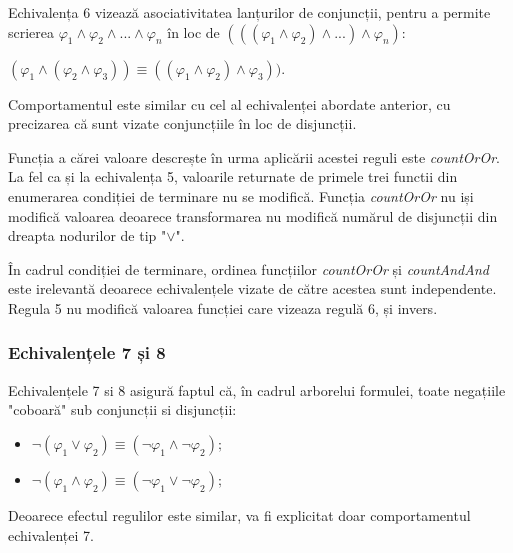 Echivalența 6 vizează asociativitatea lanțurilor de conjuncții, pentru a permite scrierea $\varphi_1 \land \varphi_2 \land  . . . \land \varphi_n$ în loc de
$(((\varphi_1 \land \varphi_2) \land  . . .) \land \varphi_n)$:
\begin{center}
$(\varphi_1 \land (\varphi_2 \land \varphi_3)) \equiv ((\varphi_1 \land \varphi_2) \land \varphi_3))$.
\end{center}

Comportamentul este similar cu cel al echivalenței abordate anterior, cu precizarea că sunt vizate conjuncțiile în loc de disjuncții.

Funcția a cărei valoare descrește în urma aplicării acestei reguli este \textit{countOrOr}. La fel ca și la echivalența 5, valoarile returnate de primele trei functii din enumerarea condiției de terminare nu se modifică. Funcția \textit{countOrOr} nu iși modifică valoarea deoarece transformarea nu modifică numărul de disjuncții din dreapta nodurilor de tip "$\lor$".

\begin{remark}
În cadrul condiției de terminare, ordinea funcțiilor \textit{countOrOr} și \textit{countAndAnd} este irelevantă deoarece echivalențele vizate de către acestea sunt independente. Regula 5 nu modifică valoarea funcției care vizeaza regulă 6, și invers. 
\end{remark}

\subsubsection{Echivalențele 7 și 8}

Echivalențele 7 si 8 asigură faptul că, în cadrul arborelui formulei, toate negațiile "coboară" sub conjuncții si disjuncții:
\begin{itemize}
\item $\neg (\varphi_1 \lor \varphi_2) \equiv (\neg \varphi_1 \land \neg \varphi_2);$
\item $\neg (\varphi_1 \land \varphi_2) \equiv (\neg \varphi_1 \lor \neg \varphi_2);$
\end{itemize}


Deoarece efectul regulilor este similar, va fi explicitat doar comportamentul echivalenței 7. 


